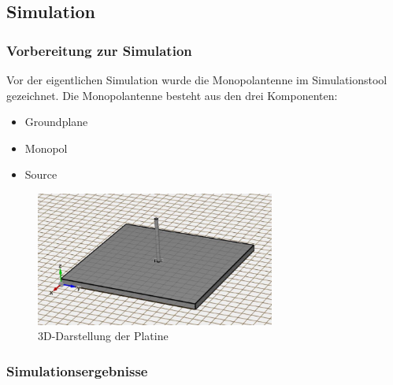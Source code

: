 \vspace{30mm}

\subsection{Simulation}

\subsubsection{Vorbereitung zur Simulation}

Vor der eigentlichen Simulation wurde die Monopolantenne im Simulationstool gezeichnet. Die Monopolantenne besteht aus den drei Komponenten:
\begin{itemize}
	\item Groundplane
	\item Monopol
	\item Source
\end{itemize}

\begin{figure}[htbp]
	\centering
	\includegraphics[width=0.7\textwidth]{pic/Simulationen/3D.JPG}
	\caption{3D-Darstellung der Platine}
	\label{fig:3Ddarstellung}
\end{figure}

\newpage

\subsubsection{Simulationsergebnisse}



